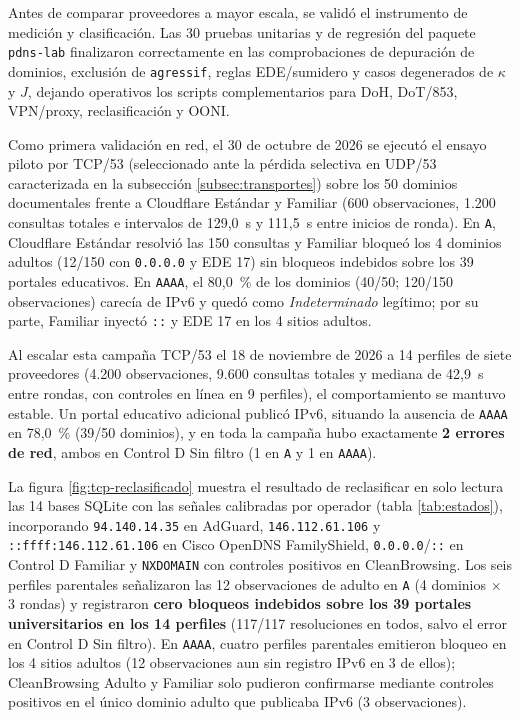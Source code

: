 \documentclass[10pt,a4paper]{article}
\begin{document}
Antes de comparar proveedores a mayor escala, se validó el instrumento de medición y clasificación. Las 30 pruebas unitarias y de regresión del paquete \texttt{pdns-lab} finalizaron correctamente en las comprobaciones de depuración de dominios, exclusión de \texttt{agressif}, reglas EDE/sumidero y casos degenerados de $\kappa$ y $J$, dejando operativos los scripts complementarios para DoH, DoT/853, VPN/proxy, reclasificación y OONI.

Como primera validación en red, el 30 de octubre de 2026 se ejecutó el ensayo piloto por TCP/53 (seleccionado ante la pérdida selectiva en UDP/53 caracterizada en la subsección \ref{subsec:transportes}) sobre los 50 dominios documentales frente a Cloudflare Estándar y Familiar (600 observaciones, 1.200 consultas totales e intervalos de 129,0~s y 111,5~s entre inicios de ronda). En \texttt{A}, Cloudflare Estándar resolvió las 150 consultas y Familiar bloqueó los 4 dominios adultos (12/150 con \texttt{0.0.0.0} y EDE 17) sin bloqueos indebidos sobre los 39 portales educativos. En \texttt{AAAA}, el 80,0~\% de los dominios (40/50; 120/150 observaciones) carecía de IPv6 y quedó como \emph{Indeterminado} legítimo; por su parte, Familiar inyectó \texttt{::} y EDE 17 en los 4 sitios adultos.

Al escalar esta campaña TCP/53 el 18 de noviembre de 2026 a 14 perfiles de siete proveedores (4.200 observaciones, 9.600 consultas totales y mediana de 42,9~s entre rondas, con controles en línea en 9 perfiles), el comportamiento se mantuvo estable. Un portal educativo adicional publicó IPv6, situando la ausencia de \texttt{AAAA} en 78,0~\% (39/50 dominios), y en toda la campaña hubo exactamente \textbf{2 errores de red}, ambos en Control D Sin filtro (1 en \texttt{A} y 1 en \texttt{AAAA}).

La figura \ref{fig:tcp-reclasificado} muestra el resultado de reclasificar en solo lectura las 14 bases SQLite con las señales calibradas por operador (tabla \ref{tab:estados}), incorporando \texttt{94.140.14.35} en AdGuard, \texttt{146.112.61.106} y \texttt{::ffff:146.112.61.106} en Cisco OpenDNS FamilyShield, \texttt{0.0.0.0}/\texttt{::} en Control D Familiar y \texttt{NXDOMAIN} con controles positivos en CleanBrowsing. Los seis perfiles parentales señalizaron las 12 observaciones de adulto en \texttt{A} (4 dominios $\times$ 3 rondas) y registraron \textbf{cero bloqueos indebidos sobre los 39 portales universitarios en los 14 perfiles} (117/117 resoluciones en todos, salvo el error en Control D Sin filtro). En \texttt{AAAA}, cuatro perfiles parentales emitieron bloqueo en los 4 sitios adultos (12 observaciones aun sin registro IPv6 en 3 de ellos); CleanBrowsing Adulto y Familiar solo pudieron confirmarse mediante controles positivos en el único dominio adulto que publicaba IPv6 (3 observaciones).
\end{document}

